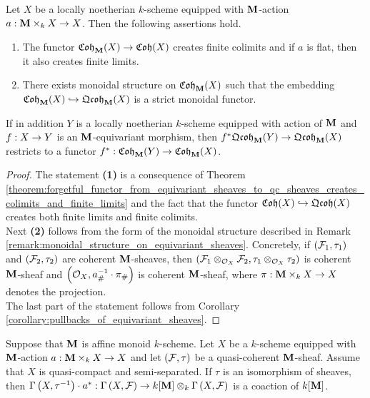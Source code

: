 \begin{corollary}\label{corollary:coherent_equivariant_sheaves_properties}
Let $X$ be a locally noetherian $k$-scheme equipped with $\mathbf{M}$-action $a:\mathbf{M}\times_kX\rightarrow X$. Then the following assertions hold.
\begin{enumerate}[label= \emph{\textbf{(\arabic*)}}, leftmargin=3.0em]
\item The functor $\mathfrak{Coh}_{\mathbf{M}}(X)\rightarrow \mathfrak{Coh}(X)$ creates finite colimits and if $a$ is flat, then it also creates finite limits.
\item There exists monoidal structure on $\mathfrak{Coh}_{\mathbf{M}}(X)$ such that the embedding $\mathfrak{Coh}_{\mathbf{M}}(X)\hookrightarrow \mathfrak{Qcoh}_{\mathbf{M}}(X)$ is a strict monoidal functor.
\end{enumerate}
If in addition $Y$ is a locally noetherian $k$-scheme equipped with action of $\mathbf{M}$ and $f:X\rightarrow Y$ is an $\mathbf{M}$-equivariant morphism, then $f^*\mathfrak{Qcoh}_{\mathbf{M}}(Y)\rightarrow \mathfrak{Qcoh}_{\mathbf{M}}(X)$ restricts to a functor $f^*:\mathfrak{Coh}_{\mathbf{M}}(Y)\rightarrow \mathfrak{Coh}_{\mathbf{M}}(X)$.
\end{corollary}
\begin{proof}
The statement \textbf{(1)} is a consequence of Theorem \ref{theorem:forgetful_functor_from_equivariant_sheaves_to_qc_sheaves_creates_colimits_and_finite_limits} and the fact that the functor $\mathfrak{Coh}(X)\hookrightarrow \mathfrak{Qcoh}(X)$ creates both finite limits and finite colimits.\\
Next \textbf{(2)} follows from the form of the monoidal structure described in Remark \ref{remark:monoidal_structure_on_equivariant_sheaves}. Concretely, if $({\mathcal F}_1,\tau_1)$ and $({\mathcal F}_2,\tau_2)$ are coherent $\mathbf{M}$-sheaves, then $\left({\mathcal F}_1\otimes_{{\mathcal O}_X}{\mathcal F}_2,\tau_1\otimes_{{\mathcal O}_X}\tau_2\right)$ is coherent $\mathbf{M}$-sheaf and $\left({\mathcal O}_X,a_{\#}^{-1}\cdot \pi_{\#}\right)$ is coherent $\mathbf{M}$-sheaf, where $\pi:\mathbf{M}\times_kX\rightarrow X$ denotes the projection.\\
The last part of the statement follows from Corollary \ref{corollary:pullbacks_of_equivariant_sheaves}.
\end{proof}

\begin{proposition}\label{proposition:}
Suppose that $\mathbf{M}$ is affine monoid $k$-scheme. Let $X$ be a $k$-scheme equipped with $\mathbf{M}$-action $a:\mathbf{M}\times_kX\rightarrow X$ and let $({\mathcal F},\tau)$ be a quasi-coherent $\mathbf{M}$-sheaf. Assume that $X$ is quasi-compact and semi-separated. If $\tau$ is an isomorphism of sheaves, then $\Gamma\left(X,\tau^{-1}\right)\cdot a^*:\Gamma\left(X,{\mathcal F}\right) \rightarrow k[\mathbf{M}]\otimes_k \Gamma\left(X,{\mathcal F}\right)$ is a coaction of $k[\mathbf{M}]$.
\end{proposition}

